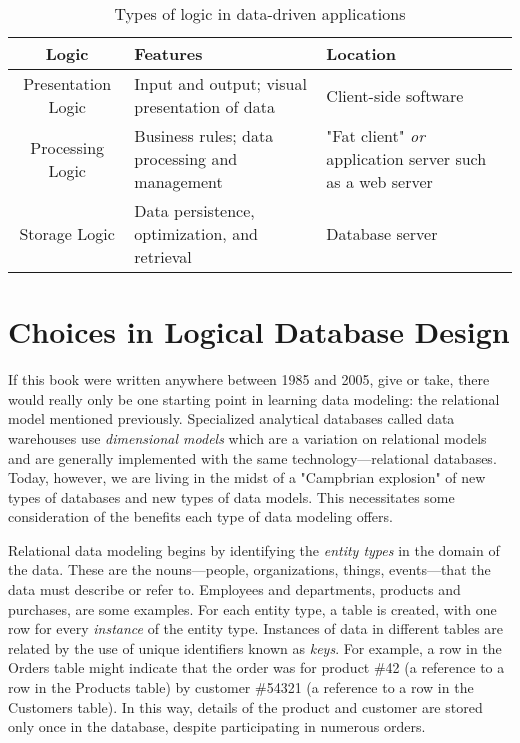 \documentclass[11pt]{book}
\newcommand{\term}[1]{\emph{#1}} %
\newcommand{\head}[1]{\textnormal{\textbf{#1}}} %
\begin{document}
\begin{table}
\centering
\caption{Types of logic in data-driven applications}\label{tab:applogic}
\vspace{10pt}
\begin{tabular}{cp{4cm}p{4.5cm}}
    \toprule[1.5pt]
    \head{Logic} & \head{Features} & \head{Location}\\
    \midrule
    Presentation Logic & Input and output; visual presentation of data & Client-side software \\
    \midrule
    Processing Logic & Business rules; data processing and management & "Fat client" \emph{or} application server such as a web server\\
    \midrule
    Storage Logic & Data persistence, optimization, and retrieval & Database server \\
    \bottomrule[1.5pt]
\end{tabular}
\end{table}

\section{Choices in Logical Database Design}

If this book were written anywhere between 1985 and 2005, give or take, there would really only be one starting point in learning data modeling: the relational model mentioned previously.  Specialized analytical databases called data warehouses use \term{dimensional models} which are a variation on relational models and are generally implemented with the same technology---relational databases.  Today, however, we are living in the midst of a "Campbrian explosion" of new types of databases and new types of data models.  This necessitates some consideration of the benefits each type of data modeling offers.

Relational data modeling begins by identifying the \term{entity types} in the domain of the data.  These are the nouns---people, organizations, things, events---that the data must describe or refer to.  Employees and departments, products and purchases, are some examples.  For each entity type, a table is created, with one row for every \term{instance} of the entity type.  Instances of data in different tables are related by the use of unique identifiers known as \term{keys}.  For example, a row in the Orders table might indicate that the order was for product \#42 (a reference to a row in the Products table) by customer \#54321 (a reference to a row in the Customers table).  In this way, details of the product and customer are stored only once in the database, despite participating in numerous orders.
\end{document}
